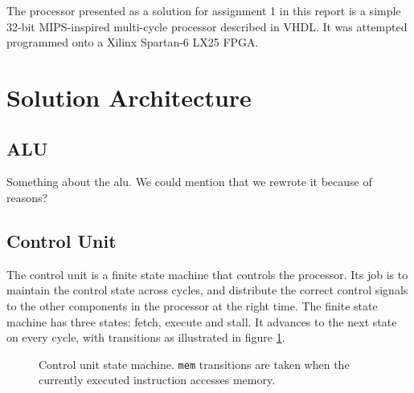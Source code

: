 The processor presented as a solution for assignment 1 in this report is a simple 32-bit MIPS-inspired multi-cycle processor described in VHDL.
It was attempted programmed onto a Xilinx Spartan-6 LX25 FPGA.

\section{Solution Architecture}




\subsection{ALU}

Something about the alu. We could mention that we rewrote it because of reasons?

\subsection{Control Unit}

The control unit is a finite state machine that controls the processor.
Its job is to maintain the control state across cycles, and distribute the correct control signals to the other components in the processor at the right time.
The finite state machine has three states: fetch, execute and stall.
It advances to the next state on every cycle, with transitions as illustrated in figure \ref{figure:control-unit-state-machine}.

\begin{figure}[h]
    \begin{center}
            \caption{
                Control unit state machine.
                \texttt{mem} transitions are taken when the currently executed instruction accesses memory.
            }
            \label{figure:control-unit-state-machine}
    \end{center}
\end{figure}

